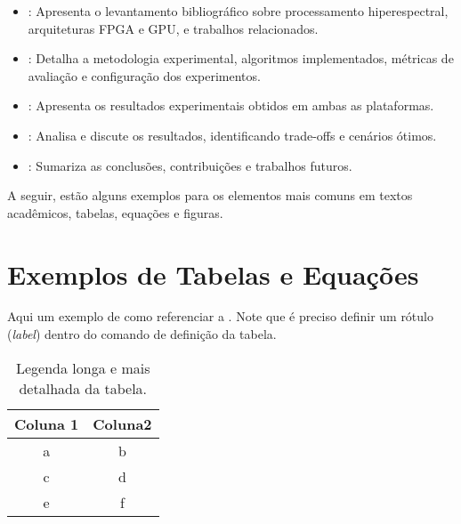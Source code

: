 \begin{itemize}
    \item \textbf{}: Apresenta o levantamento bibliográfico sobre processamento hiperespectral, arquiteturas FPGA e GPU, e trabalhos relacionados.
    
    \item \textbf{}: Detalha a metodologia experimental, algoritmos implementados, métricas de avaliação e configuração dos experimentos.
    
    \item \textbf{}: Apresenta os resultados experimentais obtidos em ambas as plataformas.
    
    \item \textbf{}: Analisa e discute os resultados, identificando trade-offs e cenários ótimos.
    
    \item \textbf{}: Sumariza as conclusões, contribuições e trabalhos futuros.
\end{itemize}


A seguir, estão alguns exemplos para os elementos mais comuns em textos acadêmicos, \ie tabelas, equações e figuras. 

\section{Exemplos de Tabelas e Equações}\label{sec:exemplostabelas}
Aqui um exemplo de como referenciar a . Note que é preciso definir um rótulo (\textit{label}) dentro do comando de definição da tabela.

\begin{table}[!htp]
\caption[Legenda curta da tabela]{Legenda longa e mais detalhada da tabela.}
\label{tab:tabela_1}
\begin{center}
\begin{tabular}{cc}
\toprule %
Coluna 1 & Coluna2 \\ \midrule %
a & b \\
c & d \\
e & f \\\bottomrule %
\end{tabular}
\end{center}
\end{table}

